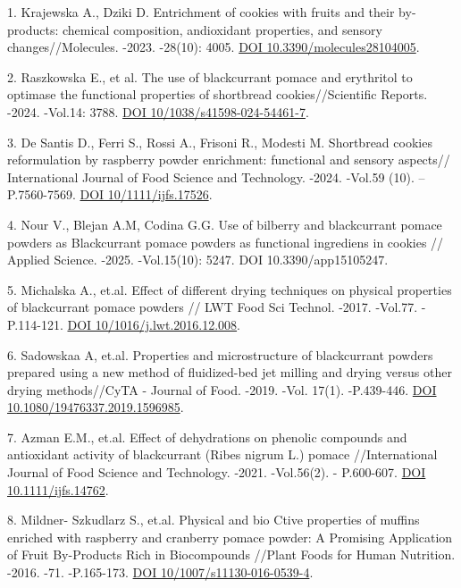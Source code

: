 \begin{refs}
1. Krajewska A., Dziki D. Entrichment of cookies with fruits and their
by-products: chemical composition, andioxidant properties, and sensory
changes//Molecules. -2023. -28(10): 4005.
\href{https://doi.org/10.3390/molecules28104005}{DOI
10.3390/molecules28104005}.

2. Raszkowska E., et al. The use of blackcurrant pomace and erythritol
to optimase the functional properties of shortbread cookies//Scientific
Reports. -2024. -Vol.14: 3788.
\href{https://doi.org/10/1038/s41598-024-54461-7}{DOI
10/1038/s41598-024-54461-7}.

3. De Santis D., Ferri S., Rossi A., Frisoni R., Modesti M. Shortbread
cookies reformulation by raspberry powder enrichment: functional and
sensory aspects// International Journal of Food Science and Technology.
-2024. -Vol.59 (10). --P.7560-7569.
\href{https://doi.org/10/1111/ijfs.17526}{DOI 10/1111/ijfs.17526}.

4. Nour V., Blejan A.M, Codina G.G. Use of bilberry and blackcurrant
pomace powders as Blackcurrant pomace powders as functional ingrediens
in cookies // Applied Science. -2025. -Vol.15(10): 5247. DOI
10.3390/app15105247.

5. Michalska A., et.al. Effect of different drying techniques on
physical properties of blackcurrant pomace powders // LWT Food Sci
Technol. -2017. -Vol.77. -P.114-121.
\href{https://doi.org/10/1016/j.lwt.2016.12.008}{DOI
10/1016/j.lwt.2016.12.008}.

6. Sadowskaa A, et.al. Properties and microstructure of blackcurrant
powders prepared using a new method of fluidized-bed jet milling and
drying versus other drying methods//CyTA - Journal of Food. -2019. -Vol.
17(1). -P.439-446.
\href{https://doi.org/10.1080/19476337.2019.1596985}{DOI
10.1080/19476337.2019.1596985}.

7. Azman E.M., et.al. Effect of dehydrations on phenolic compounds and
antioxidant activity of blackcurrant (Ribes nigrum L.) pomace
//International Journal of Food Science and Technology. -2021.
-Vol.56(2). - P.600-607. \href{https://doi.org/10.1111/ijfs.14762}{DOI
10.1111/ijfs.14762}.

8. Mildner- Szkudlarz S., et.al. Physical and bio Ctive properties of
muffins enriched with raspberry and cranberry pomace powder: A Promising
Application of Fruit By-Products Rich in Biocompounds //Plant Foods for
Human Nutrition. -2016. -71. -P.165-173.
\href{https://doi/org/10/1007/s11130-016-0539-4}{DOI
10/1007/s11130-016-0539-4}.


\end{refs}
